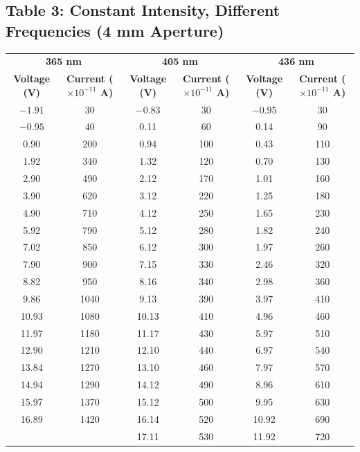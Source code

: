 \documentclass[12pt, a4paper]{article}
\begin{document}
\subsection*{Table 3: Constant Intensity, Different Frequencies (4 mm Aperture)}
\begin{table}[H]
    \centering
    \begin{tabular}{cc|cc|cc}
        \toprule
        \multicolumn{2}{c|}{\textbf{365 nm}} & \multicolumn{2}{c|}{\textbf{405 nm}} & \multicolumn{2}{c}{\textbf{436 nm}} \\
        \textbf{Voltage (V)} & \textbf{Current ($\times 10^{-11}$ A)} & \textbf{Voltage (V)} & \textbf{Current ($\times 10^{-11}$ A)} & \textbf{Voltage (V)} & \textbf{Current ($\times 10^{-11}$ A)} \\
        \midrule
        $-1.91$ & 30 & $-0.83$ & 30 & $-0.95$ & 30 \\
        $-0.95$ & 40 & 0.11 & 60 & 0.14 & 90 \\
        0.90 & 200 & 0.94 & 100 & 0.43 & 110 \\
        1.92 & 340 & 1.32 & 120 & 0.70 & 130 \\
        2.90 & 490 & 2.12 & 170 & 1.01 & 160 \\
        3.90 & 620 & 3.12 & 220 & 1.25 & 180 \\
        4.90 & 710 & 4.12 & 250 & 1.65 & 230 \\
        5.92 & 790 & 5.12 & 280 & 1.82 & 240 \\
        7.02 & 850 & 6.12 & 300 & 1.97 & 260 \\
        7.90 & 900 & 7.15 & 330 & 2.46 & 320 \\
        8.82 & 950 & 8.16 & 340 & 2.98 & 360 \\
        9.86 & 1040 & 9.13 & 390 & 3.97 & 410 \\
        10.93 & 1080 & 10.13 & 410 & 4.96 & 460 \\
        11.97 & 1180 & 11.17 & 430 & 5.97 & 510 \\
        12.90 & 1210 & 12.10 & 440 & 6.97 & 540 \\
        13.84 & 1270 & 13.10 & 460 & 7.97 & 570 \\
        14.94 & 1290 & 14.12 & 490 & 8.96 & 610 \\
        15.97 & 1370 & 15.12 & 500 & 9.95 & 630 \\
        16.89 & 1420 & 16.14 & 520 & 10.92 & 690 \\
         &  & 17.11 & 530 & 11.92 & 720 \\

\end{tabular}
\end{table}
\end{document}
